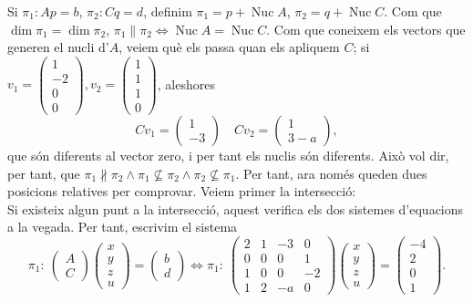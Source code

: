 \documentclass[11pt]{article}
\DeclareMathOperator{\nuc}{Nuc}
\begin{document}
Si $\pi_1:Ap=b$, $\pi_2:Cq=d$, definim $\pi_1=p+\nuc A$, $\pi_2=q+\nuc C$. Com que $\dim\pi_1=\dim\pi_2$, $\pi_1\parallel\pi_2\iff \nuc A=\nuc C$. Com que coneixem els vectors que generen el nucli d'$A$, veiem què els passa quan els apliquem $C$; si $v_1=\begin{pmatrix}
1\\ -2\\ 0\\ 0
\end{pmatrix},v_2=\begin{pmatrix}
1\\ 1\\ 1\\ 0
\end{pmatrix}$, aleshores
$$
Cv_1=\begin{pmatrix}
1\\ -3
\end{pmatrix}\quad Cv_2=\begin{pmatrix}
1\\
3-a
\end{pmatrix},
$$
que són diferents al vector zero, i per tant els nuclis són diferents. Això vol dir, per tant, que $\pi_1\nparallel\pi_2\wedge\pi_1\not\subseteq\pi_2\wedge\pi_2\not\subseteq\pi_1$. Per tant, ara només queden dues posicions relatives per comprovar. Veiem primer la intersecció:\\ Si existeix algun punt a la intersecció, aquest verifica els dos sistemes d'equacions a la vegada. Per tant, escrivim el sistema
\begin{equation}
\pi_1:\ \begin{pmatrix}
A\\ \hline
C
\end{pmatrix}\begin{pmatrix}
x\\ y\\ z\\ u
\end{pmatrix}=\begin{pmatrix}
b\\ \hline
d
\end{pmatrix}\iff\pi_1:\ \begin{pmatrix}
2 & 1 & -3 & 0\\
0 & 0 & 0 & 1\\
1 & 0 & 0 & -2\\
1 & 2 & -a & 0\end{pmatrix}\begin{pmatrix}
x\\ y\\ z\\ u
\end{pmatrix}=\begin{pmatrix}
-4\\ 2\\ 0\\ 1
\end{pmatrix}.
\end{equation}
\end{document}
